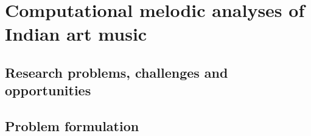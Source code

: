 \chapter{Computational melodic analyses of Indian art music}

\section{Research problems, challenges and opportunities}

\section{Problem formulation}
